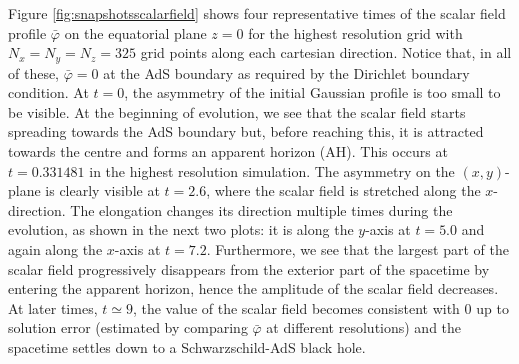 \documentclass[a4paper,11pt]{article}
\numberwithin{equation}{section}
\begin{document}
Figure \ref{fig:snapshotsscalarfield} shows four representative times of the scalar field profile $\bar{\varphi}$ on the equatorial plane $z=0$ for the highest resolution grid with $N_x=N_y=N_z=325$ grid points along each cartesian direction. Notice that, in all of these, $\bar{\varphi}=0$ at the AdS boundary as required by the Dirichlet boundary condition. At $t=0$, the asymmetry of the initial Gaussian profile is too small to be visible. At the beginning of evolution, we see that the scalar field starts spreading towards the AdS boundary but, before reaching this, it is attracted towards the centre and forms an apparent horizon (AH).  This occurs at $t=0.331481$ in the highest resolution simulation.
The asymmetry on the $(x,y)$-plane is clearly visible at $t=2.6$, where the scalar field is stretched along the $x$-direction. The elongation changes its direction multiple times during the evolution, as shown in the next two plots: it is along the $y$-axis at $t=5.0$ and again along the $x$-axis at $t=7.2$. Furthermore, we see that the largest part of the scalar field progressively disappears from the exterior part of the spacetime by entering the apparent horizon, hence the amplitude of the scalar field decreases. At later times, $t\simeq 9$, the value of the scalar field becomes consistent with 0 up to solution error (estimated by comparing $\bar{\varphi}$ at different resolutions) and the spacetime settles down to a Schwarzschild-AdS black hole.
\end{document}
